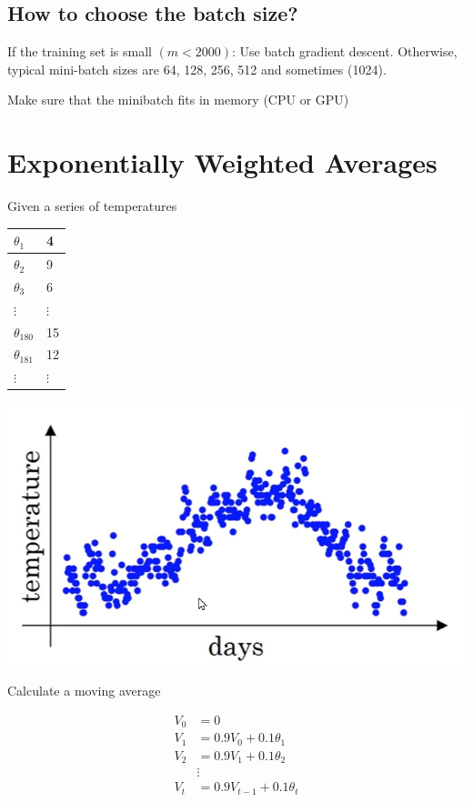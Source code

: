 \subsection*{How to choose the batch size?}

If the training set is small $(m<2000)$: Use batch gradient descent.
Otherwise, typical mini-batch sizes are 64, 128, 256, 512 and sometimes (1024).

Make sure that the minibatch fits in memory (CPU or GPU) 






\section{Exponentially Weighted Averages}

Given a series of temperatures

\begin{tabular}{ |l|l| }
    \hline
    $\theta_1$ & 4 \\
    \hline
    $\theta_2$ & 9 \\
    \hline
    $\theta_3$ & 6 \\
    \hline
    $\vdots$ & $\vdots$ \\
    \hline
    $\theta_{180}$ & 15 \\
    \hline
    $\theta_{181}$ & 12 \\
    \hline
    $\vdots$ & $\vdots$ \\
    \hline
\end{tabular}

\includegraphics[width=0.7\linewidth]{images/temperatures.png}

Calculate a moving average

\begin{align*}
    V_0 &= 0 \\
    V_1 &= 0.9 V_0 + 0.1 \theta_1 \\
    V_2 &= 0.9 V_1 + 0.1 \theta_2 \\
        & \vdots \\
    V_t &= 0.9 V_{t-1} + 0.1 \theta_t 
\end{align*}

